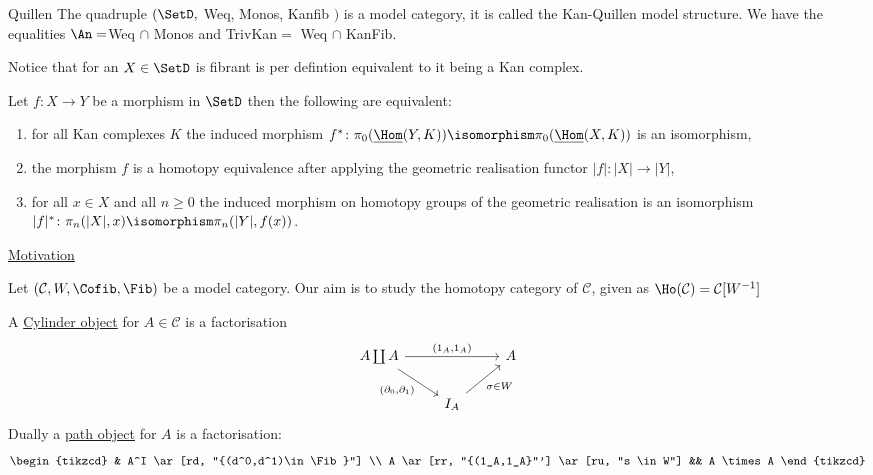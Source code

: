 \begin{thm}{Quillen}
    The quadruple $( \SetD ,$ Weq, Monos, Kanfib $)$ is a model category, it is called the Kan-Quillen model structure.
    We have the equalities $\An=$Weq $\cap$ Monos and TrivKan$=$ Weq $\cap$ KanFib. 
\end{thm}

\begin{rmk}
    Notice that for an $X \in \SetD$ is fibrant is per defintion equivalent to it being a Kan complex.
\end{rmk}

\begin{thm}
    Let $f\colon X  \to Y$ be a morphism in $\SetD$ then the following are equivalent:
    \begin{enumerate}
        \item 
        for all Kan complexes $K$ the induced morphism $f^*\colon \pi_0(\underline{\Hom}(Y,K)) \isomorphism \pi_0(\underline{\Hom}(X,K))$ is an isomorphism,
        \item 
        the morphism $f$ is a homotopy equivalence after applying the geometric realisation functor
        $\lvert f \rvert : \lvert X \rvert \to \lvert Y \rvert$,
        \item 
        for all $x \in X$ and all $n \geq 0$ the induced morphism on homotopy groups of the geometric realisation is an isomorphism $\lvert f \rvert^* \colon  \pi_n(\lvert X \rvert, x) \isomorphism \pi_n(\lvert Y \rvert, f(x))$.
    \end{enumerate}
\end{thm}

\underline{Motivation}

Let $(\mathcal{C},W, \Cofib, \Fib)$ be a model category.
Our aim is to study the homotopy category of $\mathcal{C}$, given as $\Ho(\mathcal{C})=\mathcal{C}[W^{-1}]$

\begin{defi}
    A \underline{Cylinder object} for $A \in \mathcal{C}$ is a factorisation 
    \[
    \begin{tikzcd}
        A \coprod A 
        \ar[rr, "{(1_A,1_A)}"]
        \ar[rd, "{(\partial_0, \partial_1)}"']
        &&
        A
        \\
        &
        I_A
        \ar[ru, "\sigma \in W"']
    \end{tikzcd}
    \]
    Dually a \underline{path object} for $A$ is a factorisation:
    \[
    \begin{tikzcd}
        &
        A^I
        \ar[rd, "{(d^0,d^1)\in \Fib}"]
        \\
        A
        \ar[rr, "{(1_A,1_A}"']
        \ar[ru, "s \in W"]
        &&
        A \times A
    \end{tikzcd}
    \]
\end{defi}


